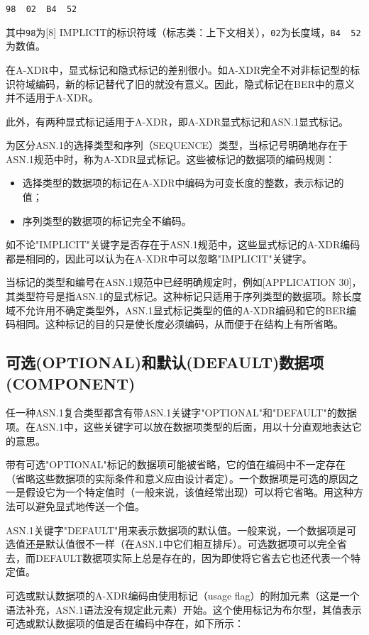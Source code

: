 \documentclass[a4paper,11pt]{ctexart}
\begin{document}
\begin{center}
\texttt{98~~02~~B4~~52}
\end{center}

\noindent 其中\texttt{98}为[8] IMPLICIT的标识符域（标志类：上下文相关），\texttt{02}为长度域，\texttt{B4~~52}为数值。

在A-XDR中，显式标记和隐式标记的差别很小。如A-XDR完全不对非标记型的标识符域编码，新的标记替代了旧的就没有意义。因此，隐式标记在BER中的意义并不适用于A-XDR。

此外，有两种显式标记适用于A-XDR，即A-XDR显式标记和ASN.1显式标记。

为区分ASN.1的选择类型和序列（SEQUENCE）类型，当标记号明确地存在于ASN.1规范中时，称为A-XDR显式标记。这些被标记的数据项的编码规则：
\begin{itemize}
\item 选择类型的数据项的标记在A-XDR中编码为可变长度的整数，表示标记的值；
\item 序列类型的数据项的标记完全不编码。
\end{itemize}

如不论"IMPLICIT"关键字是否存在于ASN.1规范中，这些显式标记的A-XDR编码都是相同的，因此可以认为在A-XDR中可以忽略"IMPLICIT"关键字。

当标记的类型和编号在ASN.1规范中已经明确规定时，例如[APPLICATION 30]，其类型符号是指ASN.1的显式标记。这种标记只适用于序列类型的数据项。除长度域不允许用不确定类型外，ASN.1显式标记类型的值的A-XDR编码和它的BER编码相同。这种标记的目的只是使长度必须编码，从而便于在结构上有所省略。

\subsection{可选(OPTIONAL)和默认(DEFAULT)数据项(COMPONENT)}

任一种ASN.1复合类型都含有带ASN.1关键字"OPTIONAL"和"DEFAULT"的数据项。在ASN.1中，这些关键字可以放在数据项类型的后面，用以十分直观地表达它的意思。

带有可选"OPTIONAL"标记的数据项可能被省略，它的值在编码中不一定存在（省略这些数据项的实际条件和意义应由设计者定）。一个数据项是可选的原因之一是假设它为一个特定值时（一般来说，该值经常出现）可以将它省略。用这种方法可以避免显式地传送一个值。

ASN.1关键字"DEFAULT"用来表示数据项的默认值。一般来说，一个数据项是可选值还是默认值很不一样（在ASN.1中它们相互排斥）。可选数据项可以完全省去，而DEFAULT数据项实际上总是存在的，因为即使将它省去它也还代表一个特定值。

可选或默认数据项的A-XDR编码由使用标记（usage flag）的附加元素（这是一个语法补充，ASN.1语法没有规定此元素）开始。这个使用标记为布尔型，其值表示可选或默认数据项的值是否在编码中存在，如下所示：
\end{document}
